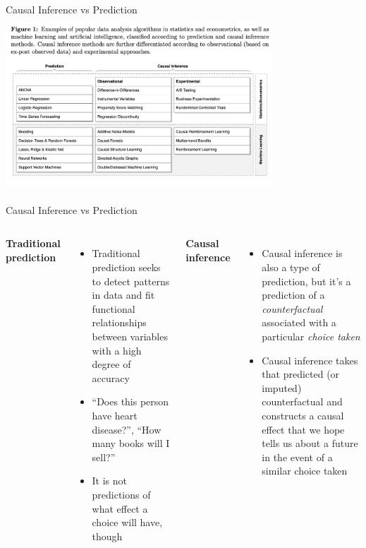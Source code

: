 \documentclass{beamer}
\begin{document}
\begin{frame}{Causal Inference vs Prediction}
  \centering
  \includegraphics[scale=0.5,height=6.5cm, width=10cm]{./lecture_includes/prediction_causality.png}
\end{frame}

\begin{frame}{Causal Inference vs Prediction}

  \begin{columns}
    \centering
    \textbf{Traditional prediction}
    \begin{itemize}
      \item Traditional prediction seeks to detect patterns in data and fit functional relationships between variables with a high degree of accuracy
      \item ``Does this person have heart disease?'', ``How many books will I sell?''
      \item It is not predictions of what effect a choice will have, though
    \end{itemize}
    \centering
    \textbf{Causal inference}
    \begin{itemize}
      \item Causal inference is also a type of prediction, but it's a prediction of a \emph{counterfactual} associated with a particular \emph{choice taken}
      \item Causal inference takes that predicted (or imputed) counterfactual and constructs a causal effect that we hope tells us about a future in the event of a similar choice taken
    \end{itemize}
  \end{columns}
\end{frame}
\end{document}
